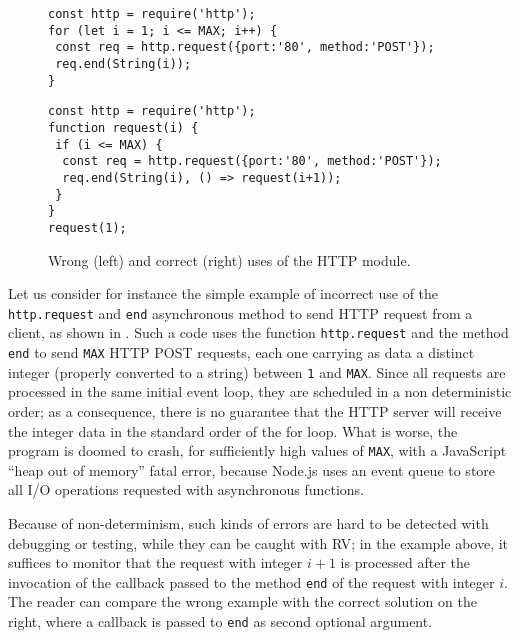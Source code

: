 \begin{figure}
\begin{minipage}{.5\linewidth}
\begin{lstlisting}[belowskip=-3em]
const http = require('http');
for (let i = 1; i <= MAX; i++) {
 const req = http.request({port:'80', method:'POST'});
 req.end(String(i));
}
\end{lstlisting}
\end{minipage}
\begin{minipage}{.5\linewidth}
\begin{lstlisting}[belowskip=-3em]
const http = require('http');
function request(i) {
 if (i <= MAX) {
  const req = http.request({port:'80', method:'POST'});
  req.end(String(i), () => request(i+1));
 }
}
request(1);
\end{lstlisting}
\end{minipage}
\caption{Wrong (left) and correct (right) uses of the HTTP module.}
\label{lst:wrongreq}
\end{figure}
Let us consider for instance the simple example of incorrect use of the \lstinline{http.request} and \lstinline{end} asynchronous method to send HTTP request from a client, as shown in .
%
%
Such a code uses the function \lstinline{http.request} and the method \lstinline{end} to send  \lstinline{MAX} HTTP POST requests,
each one carrying as data a distinct integer (properly converted to a string)
between \lstinline{1} and \lstinline{MAX}. Since all requests are processed in the same initial event loop, they are
scheduled in a non deterministic order; as a consequence, there is no guarantee that the HTTP server will receive
the integer data in the standard order of the for loop. What is worse, the program is doomed to crash, for sufficiently high values of
\lstinline{MAX}, with a JavaScript ``heap out of memory'' fatal error, because Node.js uses an event queue to store all I/O operations
requested with asynchronous functions.

Because of non-determinism, such kinds of errors are hard to be detected with debugging or testing, while they can be caught with RV; in the example above, it suffices to monitor that the request with integer $i+1$ is processed after the invocation of the callback passed to the method \lstinline{end} of the request with integer $i$.
The reader can compare the wrong example with the correct solution on the right, where a callback is passed to \lstinline{end} as second optional argument.
%

